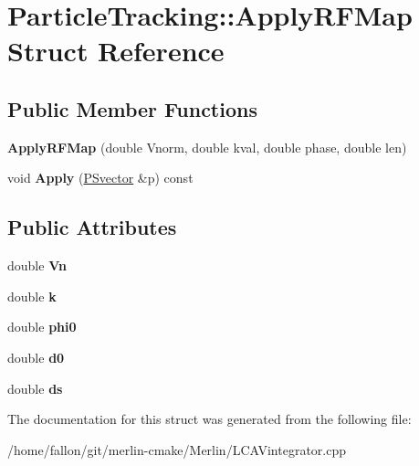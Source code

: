 \hypertarget{structParticleTracking_1_1ApplyRFMap}{}\section{Particle\+Tracking\+:\+:Apply\+R\+F\+Map Struct Reference}
\label{structParticleTracking_1_1ApplyRFMap}
\subsection*{Public Member Functions}
\begin{DoxyCompactItemize}
\item 
\mbox{\label{structParticleTracking_1_1ApplyRFMap_a5a9995fc5bfda09e713ee2960a72d6a3}} 
{\bfseries Apply\+R\+F\+Map} (double Vnorm, double kval, double phase, double len)
\item 
\mbox{\label{structParticleTracking_1_1ApplyRFMap_a3f3a431366c67d833f14febe3283081e}} 
void {\bfseries Apply} (\hyperlink{classPSvector}{P\+Svector} \&p) const
\end{DoxyCompactItemize}
\subsection*{Public Attributes}
\begin{DoxyCompactItemize}
\item 
\mbox{\label{structParticleTracking_1_1ApplyRFMap_a00e2f56a895e6d879d96359d860ff73a}} 
double {\bfseries Vn}
\item 
\mbox{\label{structParticleTracking_1_1ApplyRFMap_a92697e3534e023edbfbb89e41a8db350}} 
double {\bfseries k}
\item 
\mbox{\label{structParticleTracking_1_1ApplyRFMap_a707b319e338c38e48103973fd6d16a9c}} 
double {\bfseries phi0}
\item 
\mbox{\label{structParticleTracking_1_1ApplyRFMap_a36fec00ab667f1aa971ac79fd543614f}} 
double {\bfseries d0}
\item 
\mbox{\label{structParticleTracking_1_1ApplyRFMap_ae6f66c8cf11541f884bf11dd8d1a8bc8}} 
double {\bfseries ds}
\end{DoxyCompactItemize}


The documentation for this struct was generated from the following file\+:\begin{DoxyCompactItemize}
\item 
/home/fallon/git/merlin-\/cmake/\+Merlin/L\+C\+A\+Vintegrator.\+cpp\end{DoxyCompactItemize}
